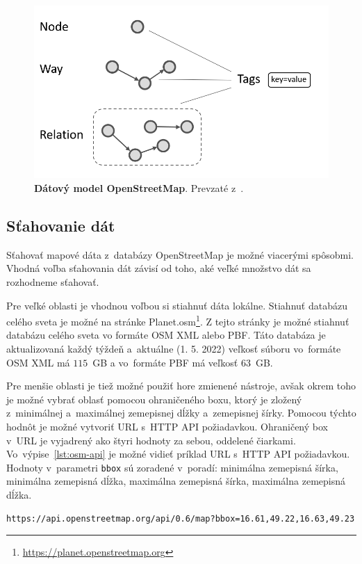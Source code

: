 \begin{figure}[ht]
    \centering
    \includegraphics[width=0.7\linewidth]{obrazky-figures/openstreetmap-datamodel.png}
    \caption{\textbf{Dátový model OpenStreetMap}. Prevzaté z~\cite{jafari2022building}.}
    \label{fig:osmdatamodel}
\end{figure}

\subsection*{Sťahovanie dát}
Sťahovať mapové dáta z~databázy OpenStreetMap je možné viacerými spôsobmi. Vhodná voľba sťahovania dát závisí od toho, aké veľké množstvo dát sa rozhodneme sťahovať.

Pre veľké oblasti je vhodnou voľbou si stiahnuť dáta lokálne. Stiahnuť databázu celého sveta je možné na stránke Planet.osm\footnote{\url{https://planet.openstreetmap.org}}. Z tejto stránky je možné stiahnuť databázu celého sveta vo formáte OSM XML alebo PBF. Táto databáza je aktualizovaná každý týždeň a~aktuálne (1. 5. 2022) veľkosť súboru vo~formáte OSM XML má $115$~GB a vo~formáte PBF má veľkosť $63$~GB.

Pre menšie oblasti je tiež možné použiť hore zmienené nástroje, avšak okrem toho je možné vybrať oblasť pomocou ohraničeného boxu, ktorý je zložený z~minimálnej a~maximálnej zemepisnej dĺžky a~zemepisnej šírky. Pomocou týchto hodnôt je možné vytvoriť URL s~HTTP API požiadavkou. Ohraničený box v~URL je vyjadrený ako štyri hodnoty za sebou, oddelené čiarkami. Vo~výpise~\ref{lst:osm-api} je možné vidieť príklad URL s~HTTP API požiadavkou. Hodnoty v~parametri \texttt{bbox} sú zoradené v~poradí: minimálna zemepisná šírka, minimálna zemepisná dĺžka, maximálna zemepisná šírka, maximálna zemepisná dĺžka.

\begin{lstlisting}
https://api.openstreetmap.org/api/0.6/map?bbox=16.61,49.22,16.63,49.23
\end{lstlisting}

